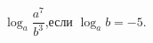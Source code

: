\begin{ex}[type=calculate_expression]
	\begin{condition}
		\( \log_a\dfrac{a^7}{b^3} \),\quad если \( \log_a b = -5 \).
	\end{condition}
\end{ex}